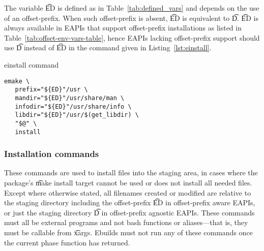 \begin{description}
    The variable \t{ED} is defined as in Table~\ref{tab:defined_vars} and depends on the use of an
    offset-prefix. When such offset-prefix is absent, \t{ED} is equivalent to \t{D}. \t{ED} is always
    available in EAPIs that support offset-prefix installations as listed in
    Table~\ref{tab:offset-env-vars-table}, hence EAPIs lacking offset-prefix support should use \t{D}
    instead of \t{ED} in the command given in Listing~\ref{lst:einstall}.
\begin{listing}[H]
  \caption{einstall command}\label{lst:einstall}
  \begin{verbatim}
emake \
   prefix="${ED}"/usr \
   mandir="${ED}"/usr/share/man \
   infodir="${ED}"/usr/share/info \
   libdir="${ED}"/usr/$(get_libdir) \
   "$@" \
   install
  \end{verbatim}
\end{listing}

\end{description}

\subsubsection{Installation commands}
These commands are used to install files into the staging area, in cases where the package's \t{make
install} target cannot be used or does not install all needed files. Except where otherwise stated,
all filenames created or modified are relative to the staging directory including the offset-prefix
\t{ED} in offset-prefix aware EAPIs, or just the staging directory \t{D} in offset-prefix agnostic
EAPIs. These commands must all be external programs and not bash functions or aliases---that is, they
must be callable from \t{xargs}. Ebuilds must not run any of these commands once the current phase
function has returned.

